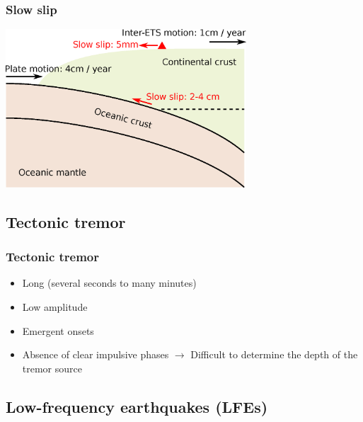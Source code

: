 \documentclass{beamer}
\begin{document}
	\begin{frame}
		\frametitle{Slow slip}
		\begin{center}
			\includegraphics[trim={0cm 0cm 0cm 0cm}, clip, width=9cm]{ETS/slow_slip.eps}
		\end{center}
	\end{frame}


	\subsection{Tectonic tremor}

	\begin{frame}
		\frametitle{Tectonic tremor}
		\begin{itemize}
			\item Long (several seconds to many minutes)
			\item Low amplitude
			\item Emergent onsets
			\item Absence of clear impulsive phases $\rightarrow$ Difficult to determine the depth of the tremor source
		\end{itemize}
	\end{frame}


	\subsection{Low-frequency earthquakes (LFEs)}
\end{document}
